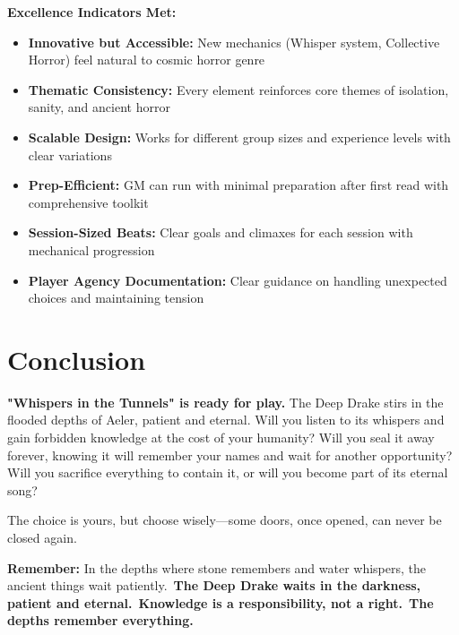 \documentclass[11pt]{article}
\begin{document}
\textbf{Excellence Indicators Met:} \begin{itemize} \item \checkmark \textbf{Innovative but Accessible:} New mechanics (Whisper system, Collective Horror) feel natural to cosmic horror genre \item \checkmark \textbf{Thematic Consistency:} Every element reinforces core themes of isolation, sanity, and ancient horror \item \checkmark \textbf{Scalable Design:} Works for different group sizes and experience levels with clear variations \item \checkmark \textbf{Prep-Efficient:} GM can run with minimal preparation after first read with comprehensive toolkit \item \checkmark \textbf{Session-Sized Beats:} Clear goals and climaxes for each session with mechanical progression \item \checkmark \textbf{Player Agency Documentation:} Clear guidance on handling unexpected choices and maintaining tension \end{itemize}

\section*{Conclusion}

\textbf{"Whispers in the Tunnels" is ready for play.} The Deep Drake stirs in the flooded depths of Aeler, patient and eternal. Will you listen to its whispers and gain forbidden knowledge at the cost of your humanity? Will you seal it away forever, knowing it will remember your names and wait for another opportunity? Will you sacrifice everything to contain it, or will you become part of its eternal song?

The choice is yours, but choose wisely—some doors, once opened, can never be closed again.

\begin{center} 

\vspace{1cm}

\textbf{Remember:} In the depths where stone remembers and water whispers, the ancient things wait patiently.\ \textbf{The Deep Drake waits in the darkness, patient and eternal.}\ \textbf{Knowledge is a responsibility, not a right.}\ \textbf{The depths remember everything.} \end{center}
\end{document}
